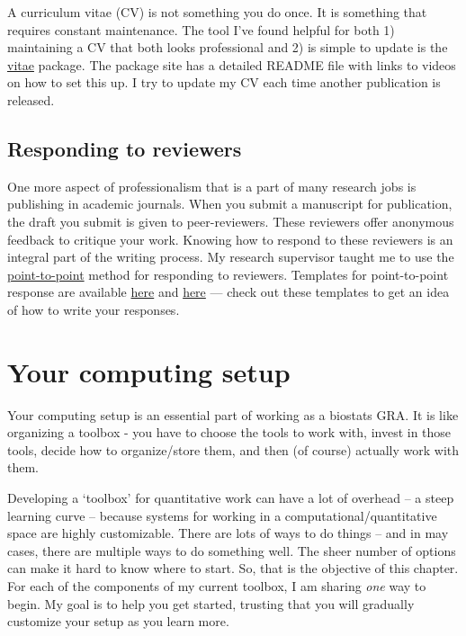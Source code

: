 \documentclass[
]{book}
\begin{document}
A curriculum vitae (CV) is not something you do once. It is something that requires constant maintenance. The tool I've found helpful for both 1) maintaining a CV that both looks professional and 2) is simple to update is the \href{https://pkg.mitchelloharawild.com/vitae/}{vitae} package. The package site has a detailed README file with links to videos on how to set this up. I try to update my CV each time another publication is released.

\hypertarget{point-to-point}{%
\section{Responding to reviewers}\label{point-to-point}}

One more aspect of professionalism that is a part of many research jobs is publishing in academic journals. When you submit a manuscript for publication, the draft you submit is given to peer-reviewers. These reviewers offer anonymous feedback to critique your work. Knowing how to respond to these reviewers is an integral part of the writing process. My research supervisor taught me to use the \href{https://www.nature.com/documents/Effective_Response_To_Reviewers-1.pdf}{point-to-point} method for responding to reviewers. Templates for point-to-point response are available \href{https://onlinelibrary.wiley.com/pb-assets/assets/13989995/Point-by-point\%20response-24-January\%202019_CA\%20approved-1549540165760.docx}{here} and \href{https://apastyle.apa.org/style-grammar-guidelines/research-publication/sample-response-reviewers.pdf}{here} --- check out these templates to get an idea of how to write your responses.

\hypertarget{your-computing-setup}{%
\chapter{Your computing setup}\label{your-computing-setup}}

Your computing setup is an essential part of working as a biostats GRA. It is like organizing a toolbox - you have to choose the tools to work with, invest in those tools, decide how to organize/store them, and then (of course) actually work with them.

Developing a `toolbox' for quantitative work can have a lot of overhead -- a steep learning curve -- because systems for working in a computational/quantitative space are highly customizable. There are lots of ways to do things -- and in may cases, there are multiple ways to do something well. The sheer number of options can make it hard to know where to start. So, that is the objective of this chapter. For each of the components of my current toolbox, I am sharing \emph{one} way to begin. My goal is to help you get started, trusting that you will gradually customize your setup as you learn more.
\end{document}
